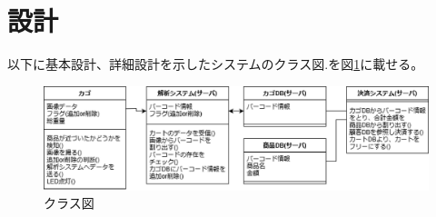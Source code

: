 \section{設計}
以下に基本設計、詳細設計を示したシステムのクラス図\cite{v_model}.を図\ref{class}に載せる。
\begin{figure}[htbp]
\centering
\includegraphics[width=15cm]{./pic/class_final.eps}
\caption{クラス図}
\label{class}
\end{figure}

